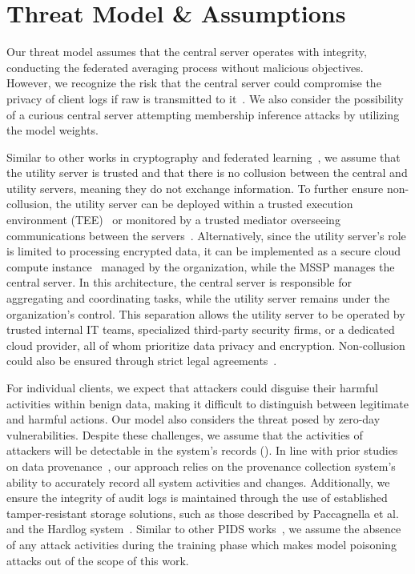 
\section{Threat Model \& Assumptions}

Our threat model assumes that the central server operates with integrity, conducting the federated averaging process without malicious objectives. However, we recognize the risk that the central server could compromise the privacy of client logs if raw \logs is transmitted to it~\cite{man2021intelligent,li2023efficient}. We also consider the possibility of a curious central server attempting membership inference attacks by utilizing the model weights.

Similar to other works in cryptography and federated learning~\cite{roy2020crypte,wu2022federated}, we assume that the utility server is trusted and that there is no collusion between the central and utility servers, meaning they do not exchange information. To further ensure non-collusion, the utility server can be deployed within a trusted execution environment (TEE)~\cite{mckeen2016intel} or monitored by a trusted mediator overseeing communications between the servers~\cite{alwen2009collusion}. Alternatively, since the utility server's role is limited to processing encrypted data, it can be implemented as a secure cloud compute instance~\cite{cloudinstance} managed by the organization, while the MSSP manages the central server. In this architecture, the central server is responsible for aggregating and coordinating tasks, while the utility server remains under the organization's control. This separation allows the utility server to be operated by trusted internal IT teams, specialized third-party security firms, or a dedicated cloud provider, all of whom prioritize data privacy and encryption. Non-collusion could also be ensured through strict legal agreements~.

For individual clients, we expect that attackers could disguise their harmful activities within benign data, making it difficult to distinguish between legitimate and harmful actions. Our model also considers the threat posed by zero-day vulnerabilities. Despite these challenges, we assume that the activities of attackers will be detectable in the system's records (\logs). In line with prior studies on data provenance~\cite{nodoze2019, priotracker2018, mzx2016, bates2017transparent, omegalog, rapsheet2020, provthings2018, dossier, inam2023sok, poirot2019, kwon18mci, winnower2018, lzx2013, ma2015accurate, ma2018kernel, mpi}, our approach relies on the provenance collection system's ability to accurately record all system activities and changes. Additionally, we ensure the integrity of audit logs is maintained through the use of established tamper-resistant storage solutions, such as those described by Paccagnella et al.~\cite{paccagnella2020custos} and the Hardlog system~\cite{hardlog}. Similar to other PIDS works~\cite{cheng2023kairos, flash2024, yangprographer, wang2022threatrace, provdetector2020}, we assume the absence of any attack activities during the training phase which makes model poisoning attacks out of the scope of this work.

